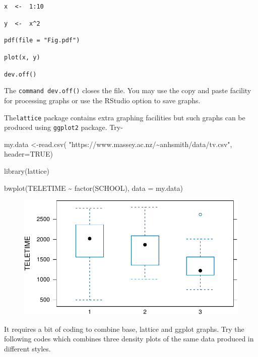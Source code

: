 \documentclass[
  letterpaper,
  DIV=11,
  numbers=noendperiod]{scrreprt}
\newenvironment{Shaded}{\begin{snugshade}}{\end{snugshade}}
\newcommand{\AttributeTok}[1]{\textcolor[rgb]{0.40,0.45,0.13}{#1}}
\newcommand{\ConstantTok}[1]{\textcolor[rgb]{0.56,0.35,0.01}{#1}}
\newcommand{\FunctionTok}[1]{\textcolor[rgb]{0.28,0.35,0.67}{#1}}
\newcommand{\NormalTok}[1]{\textcolor[rgb]{0.00,0.23,0.31}{#1}}
\newcommand{\OtherTok}[1]{\textcolor[rgb]{0.00,0.23,0.31}{#1}}
\newcommand{\SpecialCharTok}[1]{\textcolor[rgb]{0.37,0.37,0.37}{#1}}
\newcommand{\StringTok}[1]{\textcolor[rgb]{0.13,0.47,0.30}{#1}}
\begin{document}
\texttt{x\ \ \textless{}-\ \ 1:10}

\texttt{y\ \ \textless{}-\ \ x\^{}2}

\texttt{pdf(file\ =\ "Fig.pdf")}

\texttt{plot(x,\ y)}

\texttt{dev.off()}

The \texttt{command\ dev.off()} closes the file. You may use the copy
and paste facility for processing graphs or use the RStudio option to
save graphs.

The\texttt{lattice} package contains extra graphing facilities but such
graphs can be produced using \texttt{ggplot2} package. Try-

\begin{Shaded}
\begin{Highlighting}[]
\NormalTok{my.data }\OtherTok{\textless{}{-}}\FunctionTok{read.csv}\NormalTok{(}
  \StringTok{"https://www.massey.ac.nz/\textasciitilde{}anhsmith/data/tv.csv"}\NormalTok{, }
  \AttributeTok{header=}\ConstantTok{TRUE}\NormalTok{)}

\FunctionTok{library}\NormalTok{(lattice)}

\FunctionTok{bwplot}\NormalTok{(TELETIME }\SpecialCharTok{\textasciitilde{}} \FunctionTok{factor}\NormalTok{(SCHOOL), }
       \AttributeTok{data =}\NormalTok{ my.data)}
\end{Highlighting}
\end{Shaded}

\begin{figure}[H]

{\centering \includegraphics{0-R-tidyverse_files/figure-pdf/unnamed-chunk-22-1.pdf}

}

\end{figure}

It requires a bit of coding to combine base, lattice and ggplot graphs.
Try the following codes which combines three density plots of the same
data produced in different styles.
\end{document}
